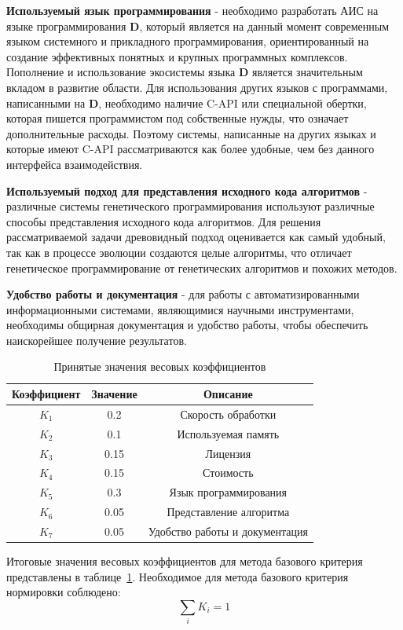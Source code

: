 \documentclass[russian,utf8,emptystyle]{eskdtext}
\begin{document}
\begin{spacing}{1.5}
\textbf{Используемый язык программирования} - необходимо разработать АИС на языке программирования \textbf{D}, который является на данный момент современным языком системного и прикладного программирования, ориентированный на создание эффективных понятных и крупных программных комплексов. Пополнение и использование экосистемы языка \textbf{D} является значительным вкладом в развитие области. Для использования других языков с программами, написанными на \textbf{D}, необходимо наличие C-API или специальной обертки, которая пишется программистом под собственные нужды, что означает дополнительные расходы. Поэтому системы, написанные на других языках и которые имеют C-API рассматриваются как более удобные, чем без данного интерфейса взаимодействия.

\textbf{Используемый подход для представления исходного кода алгоритмов} - различные системы генетического программирования используют различные способы представления исходного кода алгоритмов. Для решения рассматриваемой задачи древовидный подход оценивается как самый удобный, так как в процессе эволюции создаются целые алгоритмы, что отличает генетическое программирование от генетических алгоритмов и похожих методов.

\textbf{Удобство работы и документация} - для работы с автоматизированными информационными системами, являющимися научными инструментами, необходимы общирная документация и удобство работы, чтобы обеспечить наискорейшее получение результатов. 

\begin{table}
\centering
\caption{Принятые значения весовых коэффициентов}
\label{tab:quality_koeff}
\begin{tabular}{c|c|c}
Коэффициент & Значение & Описание \\ 
\hline 
$K_1$ & 0.2 & Скорость обработки \\ 
\hline 
$K_2$ & 0.1 & Используемая память \\ 
\hline 
$K_3$ & 0.15 & Лицензия \\ 
\hline 
$K_4$ & 0.15 & Стоимость \\ 
\hline 
$K_5$ & 0.3 & Язык программирования \\ 
\hline 
$K_6$ & 0.05 & Представление алгоритма \\ 
\hline 
$K_7$ & 0.05 & Удобство работы и документация 
\end{tabular} 
\end{table}

Итоговые значения весовых коэффициентов для метода базового критерия представлены в таблице~\ref{tab:quality_koeff}. Необходимое для метода базового критерия нормировки соблюдено:
$$
\sum_i K_i = 1
$$


\end{spacing}
\end{document}
